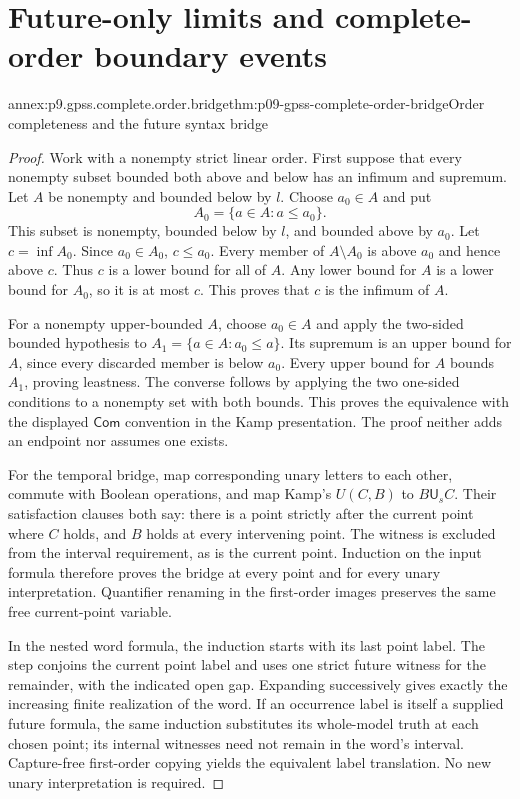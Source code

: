 
\section{Future-only limits and complete-order boundary events}
\label{sec:annex-p09-gpss-complete-order-boundaries}

\begin{annexitem}{annex:p9.gpss.complete.order.bridge}{thm:p09-gpss-complete-order-bridge}{Order completeness and the future syntax bridge}
\begin{proof}
Work with a nonempty strict linear order. First suppose that every
nonempty subset bounded both above and below has an infimum and
supremum. Let \(A\) be nonempty and bounded below by \(l\).
Choose \(a_0\in A\) and put
\[
                         A_0=\{a\in A:a\leq a_0\}.
\]
This subset is nonempty, bounded below by \(l\), and bounded above
by \(a_0\). Let \(c=\inf A_0\). Since \(a_0\in A_0\),
\(c\leq a_0\). Every member of \(A\setminus A_0\) is above
\(a_0\) and hence above \(c\). Thus \(c\) is a lower bound
for all of \(A\). Any lower bound for \(A\) is a lower bound
for \(A_0\), so it is at most \(c\). This proves that \(c\)
is the infimum of \(A\).

For a nonempty upper-bounded \(A\), choose \(a_0\in A\) and
apply the two-sided bounded hypothesis to
\(A_1=\{a\in A:a_0\leq a\}\). Its supremum is an upper
bound for \(A\), since every discarded member is below \(a_0\).
Every upper bound for \(A\) bounds \(A_1\), proving leastness.
The converse follows by applying the two one-sided conditions to
a nonempty set with both bounds. This proves the equivalence with
the displayed \(\mathsf{Com}\) convention in the Kamp presentation.
The proof neither adds an endpoint nor assumes one exists.

For the temporal bridge, map corresponding unary letters to each other,
commute with Boolean operations, and map Kamp's \(U(C,B)\) to
\(B\mathbin{\mathsf U_s}C\). Their satisfaction clauses both say:
there is a point strictly after the current point where \(C\) holds,
and \(B\) holds at every intervening point. The witness is excluded
from the interval requirement, as is the current point. Induction
on the input formula therefore proves the bridge at every point
and for every unary interpretation. Quantifier renaming in the
first-order images preserves the same free current-point variable.

In the nested word formula, the induction starts with its last point
label. The step conjoins the current point label and uses one strict
future witness for the remainder, with the indicated open gap.
Expanding successively gives exactly the increasing finite realization
of the word. If an occurrence label is itself a supplied future
formula, the same induction substitutes its whole-model truth at each
chosen point; its internal witnesses need not remain in the word's
interval. Capture-free first-order copying yields the equivalent
label translation. No new unary interpretation is required.


\end{proof}
\end{annexitem}
